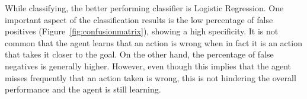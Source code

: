 \documentclass[journal]{IEEEtran}
\begin{document}
{{While classifying, the better performing classifier is Logistic Regression. One important aspect of the classification results is the low percentage of false positives (Figure~\ref{fig:confusionmatrix}), showing a high specificity.  It is not common that the agent learns that an action is wrong when in fact it is an action that takes it closer to the goal. On the other hand, the percentage of false negatives is generally higher.  However, even though this implies that the agent misses frequently that an action taken is wrong, this is not hindering the overall performance and the agent is still learning.



}}
\end{document}
